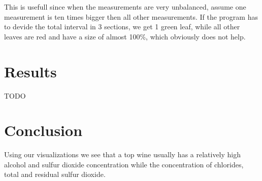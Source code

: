 \documentclass[a4paper,twoside,11pt]{article}
\begin{document}
This is usefull since when the measurements are very unbalanced, assume one measurement is ten times bigger then all other measurements. If the program has to devide the total interval in 3 sections, we get 1 green leaf, while all other leaves are red and have a size of almost 100\%, which obviously does not help.

\section{Results}
TODO

\section{Conclusion}
Using our visualizations we see that a top wine usually has a relatively high alcohol and sulfur dioxide concentration while the concentration of chlorides, total and residual sulfur dioxide.
\end{document}
